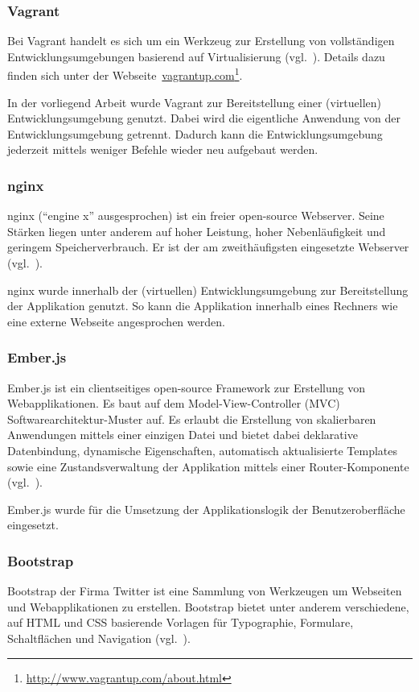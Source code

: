 \subsubsection{Vagrant}
\label{ssubsec:komponenten:gui:komponenten:vagrant}
Bei Vagrant handelt es sich um ein Werkzeug zur Erstellung von vollständigen Entwicklungsumgebungen basierend auf Virtualisierung (vgl.~\cite{vagrant}). Details dazu finden sich unter der Webseite~\href{http://www.vagrantup.com/about.html}{vagrantup.com}\footnote{\url{http://www.vagrantup.com/about.html}}.

In der vorliegend Arbeit wurde Vagrant zur Bereitstellung einer (virtuellen) Entwicklungsumgebung genutzt. Dabei wird die eigentliche Anwendung von der Entwicklungsumgebung getrennt. Dadurch kann die Entwicklungsumgebung jederzeit mittels weniger Befehle wieder neu aufgebaut werden.

\subsubsection{nginx}
\label{ssubsec:komponenten:gui:komponenten:nginx}
nginx (``engine x'' ausgesprochen) ist ein freier open-source Webserver. Seine Stärken liegen unter anderem  auf hoher Leistung, hoher Nebenläufigkeit und geringem Speicherverbrauch. Er ist der am zweithäufigsten eingesetzte Webserver (vgl.~\cite{nginx}).

nginx wurde innerhalb der (virtuellen) Entwicklungsumgebung zur Bereitstellung der Applikation genutzt. So kann die Applikation innerhalb eines Rechners wie eine externe Webseite angesprochen werden.

\subsubsection{Ember.js}
\label{ssubsec:komponenten:gui:komponenten:emberjs}
Ember.js ist ein clientseitiges open-source Framework zur Erstellung von Webapplikationen. Es baut auf dem Model-View-Controller (MVC) Softwarearchitektur-Muster auf. Es erlaubt die Erstellung von skalierbaren Anwendungen mittels einer einzigen Datei und bietet dabei deklarative Datenbindung, dynamische Eigenschaften, automatisch aktualisierte Templates sowie eine Zustandsverwaltung der Applikation mittels einer Router-Komponente (vgl.~\cite{ember}).

Ember.js wurde für die Umsetzung der Applikationslogik der Benutzeroberfläche eingesetzt.

\subsubsection{Bootstrap}
\label{ssubsec:komponenten:gui:komponenten:bootstrap}
Bootstrap der Firma Twitter ist eine Sammlung von Werkzeugen um Webseiten und Webapplikationen zu erstellen. Bootstrap bietet unter anderem verschiedene, auf HTML und CSS basierende Vorlagen für Typographie, Formulare, Schaltflächen und Navigation (vgl.~\cite{bootstrap}).

